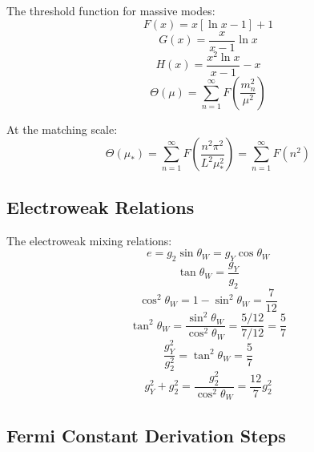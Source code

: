 \documentclass[11pt,a4paper]{article}
\begin{document}
The threshold function for massive modes:
\begin{equation}
\label{eq:ext-th-F}
F(x) = x\left[\ln x - 1\right] + 1
\end{equation}
\begin{equation}
\label{eq:ext-th-G}
G(x) = \frac{x}{x-1}\ln x
\end{equation}
\begin{equation}
\label{eq:ext-th-H}
H(x) = \frac{x^2 \ln x}{x-1} - x
\end{equation}
\begin{equation}
\label{eq:ext-th-sum}
\Theta(\mu) = \sum_{n=1}^{\infty} F\left(\frac{m_n^2}{\mu^2}\right)
\end{equation}

At the matching scale:
\begin{equation}
\label{eq:ext-th-mustar}
\Theta(\mu_*) = \sum_{n=1}^{\infty} F\left(\frac{n^2\pi^2}{L^2\mu_*^2}\right) = \sum_{n=1}^{\infty} F(n^2)
\end{equation}

\subsection*{Electroweak Relations}
\label{subsec:ew-relations}

The electroweak mixing relations:
\begin{equation}
\label{eq:ext-ew-1}
e = g_2 \sin\theta_W = g_Y \cos\theta_W
\end{equation}
\begin{equation}
\label{eq:ext-ew-2}
\tan\theta_W = \frac{g_Y}{g_2}
\end{equation}
\begin{equation}
\label{eq:ext-ew-3}
\cos^2\theta_W = 1 - \sin^2\theta_W = \frac{7}{12}
\end{equation}
\begin{equation}
\label{eq:ext-ew-4}
\tan^2\theta_W = \frac{\sin^2\theta_W}{\cos^2\theta_W} = \frac{5/12}{7/12} = \frac{5}{7}
\end{equation}
\begin{equation}
\label{eq:ext-ew-5}
\frac{g_Y^2}{g_2^2} = \tan^2\theta_W = \frac{5}{7}
\end{equation}
\begin{equation}
\label{eq:ext-ew-6}
g_Y^2 + g_2^2 = \frac{g_2^2}{\cos^2\theta_W} = \frac{12}{7}g_2^2
\end{equation}

\subsection*{Fermi Constant Derivation Steps}
\label{subsec:gf-steps}
\end{document}
